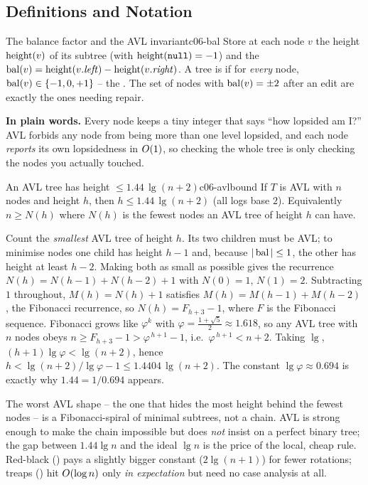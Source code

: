 \subsection{Definitions and Notation}

\begin{definition}{The balance factor and the AVL invariant}{c06-bal}
Store at each node $v$ the height $\operatorname{height}(v)$ of its subtree (with $\operatorname{height}(\texttt{null})=-1$) and the
 $\operatorname{bal}(v)=\operatorname{height}(v.\mathit{left})-\operatorname{height}(v.\mathit{right})$. A tree is
 if for \emph{every} node, $\operatorname{bal}(v)\in\{-1,0,+1\}$ -- the . The set of
nodes with $\operatorname{bal}(v)=\pm 2$ after an edit are exactly the ones needing repair.
\end{definition}

\noindent\textbf{In plain words.} Every node keeps a tiny integer that says ``how lopsided am I?'' AVL
forbids any node from being more than one level lopsided, and each node \emph{reports} its own lopsidedness
in $O(1)$, so checking the whole tree is only checking the nodes you actually touched.

\begin{theorem}{An AVL tree has height $\le 1.44\,\lg(n+2)$}{c06-avlbound}
If $T$ is AVL with $n$ nodes and height $h$, then $h \le 1.44\,\lg(n+2)$ (all logs base $2$). Equivalently
$n \ge N(h)$ where $N(h)$ is the fewest nodes an AVL tree of height $h$ can have.
\end{theorem}
\begin{proofbox}
Count the \emph{smallest} AVL tree of height $h$. Its two children must be AVL; to minimise nodes one
child has height $h-1$ and, because $|\operatorname{bal}|\le 1$, the other has height at least $h-2$. Making both as
small as possible gives the recurrence $N(h)=N(h-1)+N(h-2)+1$ with $N(0)=1$, $N(1)=2$. Subtracting $1$
throughout, $M(h)=N(h)+1$ satisfies $M(h)=M(h-1)+M(h-2)$, the Fibonacci recurrence, so
$N(h)=F_{h+3}-1$, where $F$ is the Fibonacci sequence. Fibonacci grows like $\varphi^k$ with
$\varphi=\tfrac{1+\sqrt5}{2}\approx 1.618$, so any AVL tree with $n$ nodes obeys
$n \ge F_{h+3}-1 > \varphi^{\,h+1}-1$, i.e.\ $\varphi^{\,h+1} < n+2$. Taking $\lg$,
$(h+1)\lg\varphi < \lg(n+2)$, hence $h < \lg(n+2)/\lg\varphi - 1 \le 1.4404\,\lg(n+2)$. The constant
$\lg\varphi\approx 0.694$ is exactly why $1.44=1/0.694$ appears. \end{proofbox}
\begin{insightbox}
The worst AVL shape -- the one that hides the most height behind the fewest nodes -- is a
Fibonacci-spiral of minimal subtrees, not a chain. AVL is strong enough to make the chain impossible but
does \emph{not} insist on a perfect binary tree; the gap between $1.44\lg n$ and the ideal $\lg n$ is the
price of the local, cheap rule. Red-black () pays a slightly bigger constant
($2\lg(n+1)$) for fewer rotations; treaps () hit $O(\log n)$ only \emph{in
expectation} but need no case analysis at all.
\end{insightbox}

